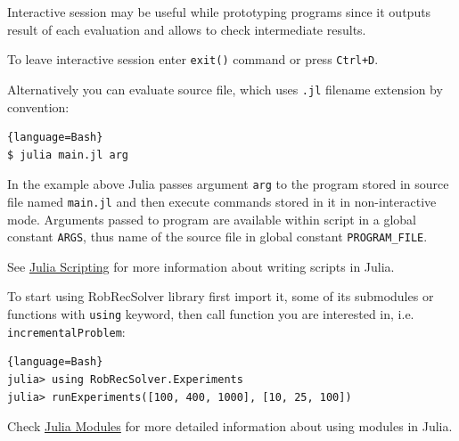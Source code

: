 Interactive session may be useful while prototyping programs since it outputs result of each evaluation and allows to check intermediate results.

To leave interactive session enter \texttt{exit()} command or press \texttt{Ctrl+D}.

Alternatively you can evaluate source file, which uses \texttt{.jl} filename extension by convention:

\begin{lstlisting}{language=Bash}
$ julia main.jl arg
\end{lstlisting}

In the example above Julia passes argument \texttt{arg} to the program stored in source file named \texttt{main.jl} and then execute commands stored in it in non-interactive mode. Arguments passed to program are available within script in a global constant \texttt{ARGS}, thus name of the source file in global constant \texttt{PROGRAM\_FILE}.

See \href{https://docs.julialang.org/en/v1/manual/faq/#man-scripting-1}{Julia Scripting} for more information about writing scripts in Julia.

To start using RobRecSolver library first import it, some of its submodules or functions with \texttt{using} keyword, then call function you are interested in, i.e. \texttt{incrementalProblem}:
\begin{lstlisting}{language=Bash}
julia> using RobRecSolver.Experiments
julia> runExperiments([100, 400, 1000], [10, 25, 100])
\end{lstlisting}
Check \href{https://docs.julialang.org/en/v0.6/manual/modules/#modules-1}{Julia Modules} for more detailed information about using modules in Julia.


